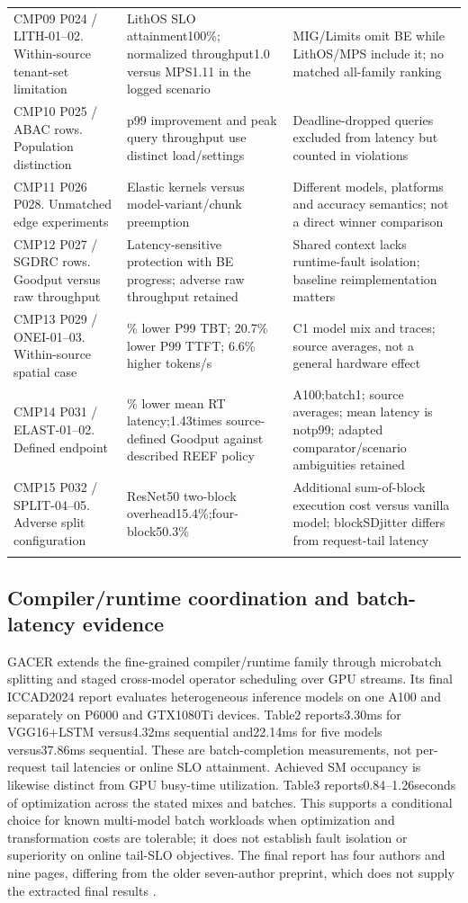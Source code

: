 \begin{longtable}{>{\raggedright\arraybackslash}p{}>{\raggedright\arraybackslash}p{}>{\raggedright\arraybackslash}p{}}
CMP09 P024 / LITH-01--02. Within-source tenant-set limitation & LithOS SLO attainment100\%; normalized throughput1.0 versus MPS1.11 in the logged scenario & MIG/Limits omit BE while LithOS/MPS include it; no matched all-family ranking\\\addlinespace
CMP10 P025 / ABAC rows. Population distinction & p99 improvement and peak query throughput use distinct load/settings & Deadline-dropped queries excluded from latency but counted in violations\\\addlinespace
CMP11 P026 P028. Unmatched edge experiments & Elastic kernels versus model-variant/chunk preemption & Different models, platforms and accuracy semantics; not a direct winner comparison\\\addlinespace
CMP12 P027 / SGDRC rows. Goodput versus raw throughput & Latency-sensitive protection with BE progress; adverse raw throughput retained & Shared context lacks runtime-fault isolation; baseline reimplementation matters\\\addlinespace
CMP13 P029 / ONEI-01--03. Within-source spatial case & 65.5\% lower P99 TBT; 20.7\% lower P99 TTFT; 6.6\% higher tokens/s & C1 model mix and traces; source averages, not a general hardware effect\\\addlinespace
CMP14 P031 / ELAST-01--02. Defined endpoint & 22\% lower mean RT latency;1.43times source-defined Goodput against described REEF policy & A100;batch1; source averages; mean latency is notp99; adapted comparator/scenario ambiguities retained\\\addlinespace
CMP15 P032 / SPLIT-04--05. Adverse split configuration & ResNet50 two-block overhead15.4\%;four-block50.3\% & Additional sum-of-block execution cost versus vanilla model; blockSDjitter differs from request-tail latency\\\addlinespace
\bottomrule\end{longtable}\subsection{Compiler/runtime coordination and batch-latency evidence}
GACER extends the fine-grained compiler/runtime family through microbatch splitting and staged cross-model operator scheduling over GPU streams. Its final ICCAD2024 report evaluates heterogeneous inference models on one A100 and separately on P6000 and GTX1080Ti devices. Table2 reports3.30ms for VGG16+LSTM versus4.32ms sequential and22.14ms for five models versus37.86ms sequential. These are batch-completion measurements, not per-request tail latencies or online SLO attainment. Achieved SM occupancy is likewise distinct from GPU busy-time utilization. Table3 reports0.84--1.26seconds of optimization across the stated mixes and batches. This supports a conditional choice for known multi-model batch workloads when optimization and transformation costs are tolerable; it does not establish fault isolation or superiority on online tail-SLO objectives. The final report has four authors and nine pages, differing from the older seven-author preprint, which does not supply the extracted final results \cite{s027}.
